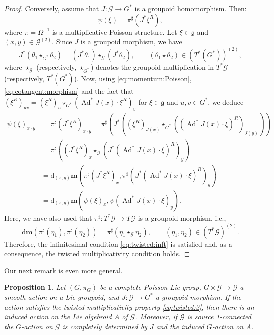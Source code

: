 \documentclass[a4paper,11pt]{amsart}
\newtheorem{prop}[thm]{Proposition}
\theoremstyle{definition}
\theoremstyle{remark}
\begin{document}
\begin{proof}
Conversely, assume that $J:{\mathcal{G}}\to G^*$ is a groupoid homomorphism.
Then:
\begin{equation}\label{eq:momentum:Poisson}
\psi(\xi)=\pi^{\sharp} (J^*\xi^R),
\end{equation}
where $\pi=\Omega^{-1}$ is a multiplicative Poisson structure. Let $\xi \in {\mathfrak{g}}$ and $(x,y)\in{\mathcal{G}}^{(2)}$. Since
$J$ is a groupoid morphism, we have
\begin{equation}\label{eq:cotangent:morphism}
J^*(\theta _1\star_{G^*} \theta _2)=(J^*\theta _1)\star_{\mathcal{G}}
(J^*\theta _2), \qquad (\theta _1\star \theta _2)\in
(T^*(G^*))^{(2)},
\end{equation}
where $\star _{\mathcal{G}}$ (respectively,  $\star _{G^*}$) denotes the groupoid multiplication in $T^*{\mathcal{G}}$
(respectively, $T^*(G^*)$). Now, using \eqref{eq:momentum:Poisson}, \eqref{eq:cotangent:morphism} and the fact
that $(\xi ^R)_{uv}=(\xi^R)_u\star _{G^*}(\operatorname{Ad}^*J(x)\cdot\xi^R)_v$ for $\xi\in {\mathfrak{g}}$ and $u,v\in G^*$, we deduce
\begin{align*}
\psi (\xi )_{x\cdot y}&=\pi ^\sharp ( J^* \xi ^R)_{x\cdot y}
=\pi ^\sharp ( J^*(( \xi ^R)_{J(x)} \star_{G^*}  ((\operatorname{Ad}^*J(x)\cdot \xi )^R)_{J(y)}))\\
&=\pi ^\sharp ( (J^* \xi ^R)_x \star_{\mathcal{G}}  (J^* (\operatorname{Ad}^*J(x)\cdot \xi )^R)_y )\\
&={\mathrm d}_{(x,y)}{\mathbf{m}}(\pi^\sharp (J^* \xi ^R)_x,\pi ^\sharp (J^*(\operatorname{Ad}^*J(x)\cdot \xi)^R)_y)\\
&={\mathrm d}_{(x,y)}{\mathbf{m}}(\psi (\xi )_x,\psi (\operatorname{Ad}^*J(x)\cdot \xi )_y) .
\end{align*}
Here, we have also used that $\pi ^\sharp :T^*{\mathcal{G}}\to T{\mathcal{G}}$ is a
groupoid morphism, i.e.,
\[
{\mathrm d}{\mathbf{m}} (\pi^\sharp (\eta _1),\pi ^\sharp (\eta _2))=\pi ^\sharp
(\eta _1\star_{\mathcal{G}} \eta _2),\qquad (\eta _1,\eta _2)\in
(T^*{\mathcal{G}})^{(2)}.
\]
Therefore, the infinitesimal condition \eqref{eq:twisted:inft} is
satisfied and, as a consequence, the twisted multiplicativity
condition holds.
\end{proof}

Our next remark is even more general.

\begin{prop}
\label{prop:general}
Let $(G,\pi_G)$ be a complete Poisson-Lie
group, $G\times {\mathcal{G}}\to{\mathcal{G}}$ a smooth action on a Lie groupoid, and
$J:{\mathcal{G}}\to G^*$ a groupoid morphism. If the action satisfies the
twisted multiplicativity property \eqref{eq:twisted:2}, then there
is an induced action on the Lie algebroid $A$ of ${\mathcal{G}}$. Moreover,
if ${\mathcal{G}}$ is source 1-connected the $G$-action on ${\mathcal{G}}$ is completely
determined by $J$ and the induced $G$-action on $A$.
\end{prop}
\end{document}
